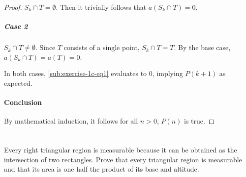 \documentclass{article}
\begin{document}
\begin{proof}
      $S_k \cap T = \emptyset$.
      Then it trivially follows that $a(S_k \cap T) = 0$.

    \subparagraph{Case 2}%

      $S_k \cap T \neq \emptyset$.
      Since $T$ consists of a single point, $S_k \cap T = T$.
      By the base case, $a(S_k \cap T) = a(T) = 0$.

    \vspace{8pt}
    \noindent
    In both cases, \eqref{sub:exercise-1c-eq1} evaluates to $0$, implying
      $P(k + 1)$ as expected.

  \paragraph{Conclusion}%

    By mathematical induction, it follows for all $n > 0$, $P(n)$ is true.

\end{proof}

\section*{}%
%

Every right triangular region is measurable because it can be obtained as the
  intersection of two rectangles.
Prove that every triangular region is measurable and that its area is one half
  the product of its base and altitude.
\end{document}
